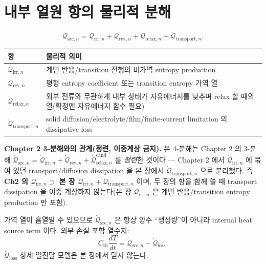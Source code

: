 \documentclass[11pt,a4paper]{article}
\newcommand{\irr}{\mathrm{irr}}
\newcommand{\rev}{\mathrm{rev}}
\newcommand{\src}{\mathrm{src}}
\newcommand{\loss}{\mathrm{loss}}
\newcommand{\rlx}{\mathrm{relax}}
\newcommand{\cand}{\mathrm{cand}}
\newcommand{\transp}{\mathrm{transport}}
\begin{document}
\section{내부 열원 항의 물리적 분해}\label{sec:ch4_decomp}
\begin{equation}
\dot{\mathcal Q}_{\src,n}=\dot{\mathcal Q}_{\irr,n}+\dot{\mathcal Q}_{\rev,n}+\dot{\mathcal Q}_{\rlx,n}+\dot{\mathcal Q}_{\transp,n}.
\label{eq:ch4_decomp}
\end{equation}
\begin{longtable}{p{} p{}}
\toprule 항 & 물리적 의미 \\ \midrule \endhead
$\dot{\mathcal Q}_{\irr,n}$ & 계면 반응/transition 진행의 비가역 entropy production \\
$\dot{\mathcal Q}_{\rev,n}$ & 평형 entropy coefficient 또는 transition entropy 가역 열 \\
$\dot{\mathcal Q}_{\rlx,n}$ & 외부 전류와 무관하게 내부 상태가 자유에너지를 낮추며 relax 할 때의 열(확정엔 자유에너지 함수 필요) \\
$\dot{\mathcal Q}_{\transp,n}$ & solid diffusion/electrolyte/film/finite-current limitation 의 dissipative loss \\
\bottomrule
\end{longtable}
\textbf{Chapter 2 3-분해와의 관계(정련, 이중계상 금지).} 본 4-분해는 Chapter 2 의 3-분해
$\dot{\mathcal Q}_{\src,n}=\dot{\mathcal Q}_{\irr,n}+\dot{\mathcal Q}_{\rev,n}+\dot{\mathcal Q}_{\rlx,n}^{\cand}$
를 \emph{정련}한 것이다 — Chapter 2 에서 $\dot{\mathcal Q}_{\irr,n}$ 에 묶여 있던 transport/diffusion
dissipation 을 본 장에서 $\dot{\mathcal Q}_{\transp,n}$ 으로 분리했다. 즉 \textbf{Ch2 의
$\dot{\mathcal Q}_{\irr,n}\supset$ 본 장 $\dot{\mathcal Q}_{\irr,n}+\dot{\mathcal Q}_{\transp,n}$} 이며, 두
장의 항을 함께 쓸 때 transport dissipation 을 이중 계상하지 않는다(본 장 $\dot{\mathcal Q}_{\irr,n}$ 은
계면 반응/transition entropy production 만 포함).

가역 열이 흡열일 수 있으므로 $\dot{\mathcal Q}_{\src,n}$ 은 항상 양수 ``생성량''이 아니라 internal heat
source term 이다. 외부 손실 포함 열수지:
\begin{equation}
C_{\mathrm{th}}\frac{dT}{dt}=\dot{\mathcal Q}_{\src,n}-\dot{\mathcal Q}_{\loss}.
\label{eq:ch4_balance}
\end{equation}
$\dot{\mathcal Q}_{\loss}$ 상세 열전달 모델은 본 장에서 닫지 않는다.

\end{document}
